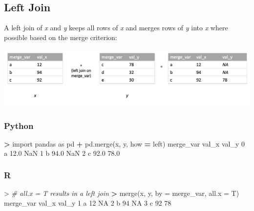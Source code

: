 \documentclass[
]{book}
\newenvironment{Shaded}{\begin{snugshade}}{\end{snugshade}}
\newcommand{\AttributeTok}[1]{\textcolor[rgb]{0.77,0.63,0.00}{#1}}
\newcommand{\CommentTok}[1]{\textcolor[rgb]{0.56,0.35,0.01}{\textit{#1}}}
\newcommand{\ConstantTok}[1]{\textcolor[rgb]{0.00,0.00,0.00}{#1}}
\newcommand{\DecValTok}[1]{\textcolor[rgb]{0.00,0.00,0.81}{#1}}
\newcommand{\ErrorTok}[1]{\textcolor[rgb]{0.64,0.00,0.00}{\textbf{#1}}}
\newcommand{\FloatTok}[1]{\textcolor[rgb]{0.00,0.00,0.81}{#1}}
\newcommand{\FunctionTok}[1]{\textcolor[rgb]{0.00,0.00,0.00}{#1}}
\newcommand{\ImportTok}[1]{#1}
\newcommand{\NormalTok}[1]{#1}
\newcommand{\OperatorTok}[1]{\textcolor[rgb]{0.81,0.36,0.00}{\textbf{#1}}}
\newcommand{\SpecialCharTok}[1]{\textcolor[rgb]{0.00,0.00,0.00}{#1}}
\newcommand{\StringTok}[1]{\textcolor[rgb]{0.31,0.60,0.02}{#1}}
\begin{document}
\hypertarget{left-join}{%
\subsection{Left Join}\label{left-join}}

A left join of \emph{x} and \emph{y} keeps all rows of \emph{x} and merges rows of \emph{y} into \emph{x} where possible based on the merge criterion:

\includegraphics[width=17.25in]{images/left_join}

\hypertarget{python-27}{%
\subsubsection*{Python}\label{python-27}}

\begin{Shaded}
\begin{Highlighting}[]
\OperatorTok{\textgreater{}} \ImportTok{import}\NormalTok{ pandas }\ImportTok{as}\NormalTok{ pd}
\OperatorTok{+}\NormalTok{ pd.merge(x, y, how }\OperatorTok{=} \StringTok{\textquotesingle{}left\textquotesingle{}}\NormalTok{)}
\NormalTok{  merge\_var  val\_x  val\_y}
\DecValTok{0}\NormalTok{         a   }\FloatTok{12.0}\NormalTok{    NaN}
\DecValTok{1}\NormalTok{         b   }\FloatTok{94.0}\NormalTok{    NaN}
\DecValTok{2}\NormalTok{         c   }\FloatTok{92.0}   \FloatTok{78.0}
\end{Highlighting}
\end{Shaded}

\hypertarget{r-27}{%
\subsubsection*{R}\label{r-27}}

\begin{Shaded}
\begin{Highlighting}[]
\SpecialCharTok{\textgreater{}} \CommentTok{\# all.x = T results in a left join}
\ErrorTok{\textgreater{}} \FunctionTok{merge}\NormalTok{(x, y, }\AttributeTok{by =} \StringTok{\textquotesingle{}merge\_var\textquotesingle{}}\NormalTok{, }\AttributeTok{all.x =}\NormalTok{ T)}
\NormalTok{  merge\_var val\_x val\_y}
\DecValTok{1}\NormalTok{         a    }\DecValTok{12}    \ConstantTok{NA}
\DecValTok{2}\NormalTok{         b    }\DecValTok{94}    \ConstantTok{NA}
\DecValTok{3}\NormalTok{         c    }\DecValTok{92}    \DecValTok{78}
\end{Highlighting}
\end{Shaded}
\end{document}
